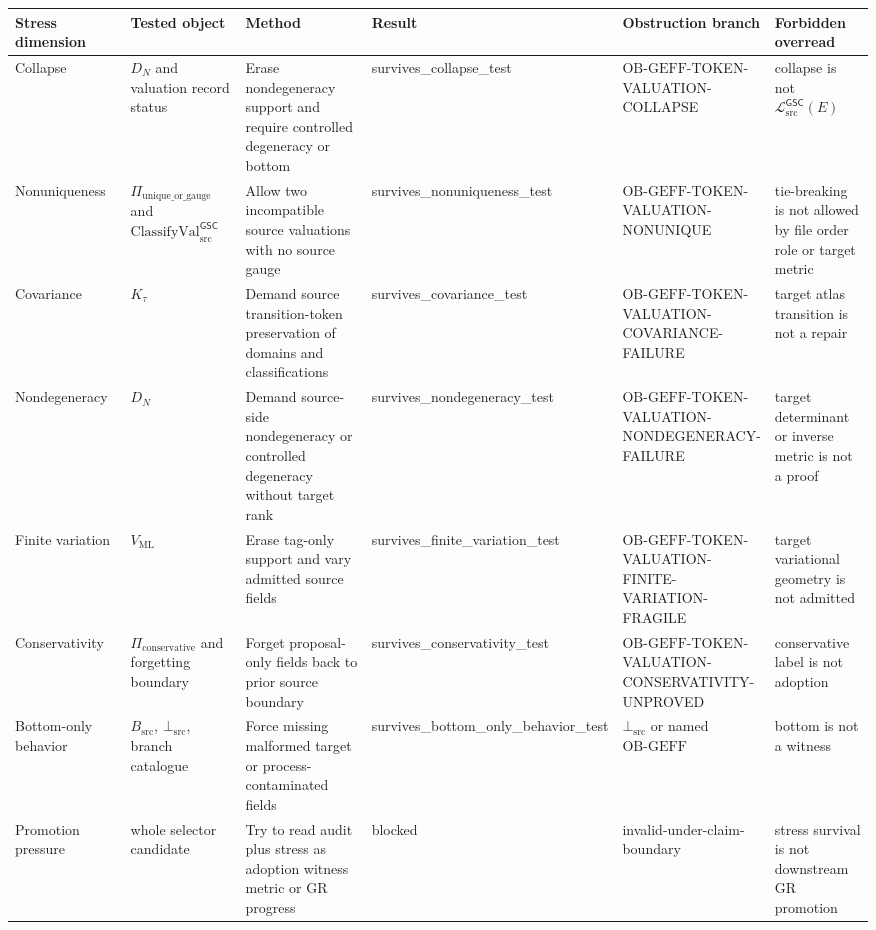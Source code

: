 \documentclass[11pt]{article}
\newcommand{\ClassVal}{\mathrm{ClassifyVal}_{\mathrm{src}}^{\mathsf{GSC}}}
\newcommand{\MetricData}{\mathcal{L}_{\mathrm{src}}^{\mathsf{GSC}}}
\newcommand{\BottomSrc}{\bot_{\mathrm{src}}}
\newcommand{\OBGEFF}{\mathrm{OB\mbox{-}GEFF}}
\begin{document}
\begin{longtable}{p{0.16\linewidth}p{0.17\linewidth}p{0.21\linewidth}p{0.16\linewidth}p{0.15\linewidth}p{0.15\linewidth}}
\toprule
Stress dimension & Tested object & Method & Result & Obstruction branch & Forbidden overread \\
\midrule
Collapse &
\(D_N\) and valuation record status &
Erase nondegeneracy support and require controlled degeneracy or bottom &
survives\_collapse\_test &
\(\OBGEFF\)-TOKEN-VALUATION-COLLAPSE &
collapse is not \(\MetricData(E)\) \\
Nonuniqueness &
\(\Pi_{\mathrm{unique\_or\_gauge}}\) and \(\ClassVal\) &
Allow two incompatible source valuations with no source gauge &
survives\_nonuniqueness\_test &
\(\OBGEFF\)-TOKEN-VALUATION-NONUNIQUE &
tie-breaking is not allowed by file order role or target metric \\
Covariance &
\(K_{\tau}\) &
Demand source transition-token preservation of domains and classifications &
survives\_covariance\_test &
\(\OBGEFF\)-TOKEN-VALUATION-COVARIANCE-FAILURE &
target atlas transition is not a repair \\
Nondegeneracy &
\(D_N\) &
Demand source-side nondegeneracy or controlled degeneracy without target rank &
survives\_nondegeneracy\_test &
\(\OBGEFF\)-TOKEN-VALUATION-NONDEGENERACY-FAILURE &
target determinant or inverse metric is not a proof \\
Finite variation &
\(V_{\mathrm{ML}}\) &
Erase tag-only support and vary admitted source fields &
survives\_finite\_variation\_test &
\(\OBGEFF\)-TOKEN-VALUATION-FINITE-VARIATION-FRAGILE &
target variational geometry is not admitted \\
Conservativity &
\(\Pi_{\mathrm{conservative}}\) and forgetting boundary &
Forget proposal-only fields back to prior source boundary &
survives\_conservativity\_test &
\(\OBGEFF\)-TOKEN-VALUATION-CONSERVATIVITY-UNPROVED &
conservative label is not adoption \\
Bottom-only behavior &
\(B_{\mathrm{src}}\), \(\BottomSrc\), branch catalogue &
Force missing malformed target or process-contaminated fields &
survives\_bottom\_only\_behavior\_test &
\(\BottomSrc\) or named \(\OBGEFF\) &
bottom is not a witness \\
Promotion pressure &
whole selector candidate &
Try to read audit plus stress as adoption witness metric or GR progress &
blocked &
invalid-under-claim-boundary &
stress survival is not downstream GR promotion \\
\bottomrule
\end{longtable}
\end{document}
